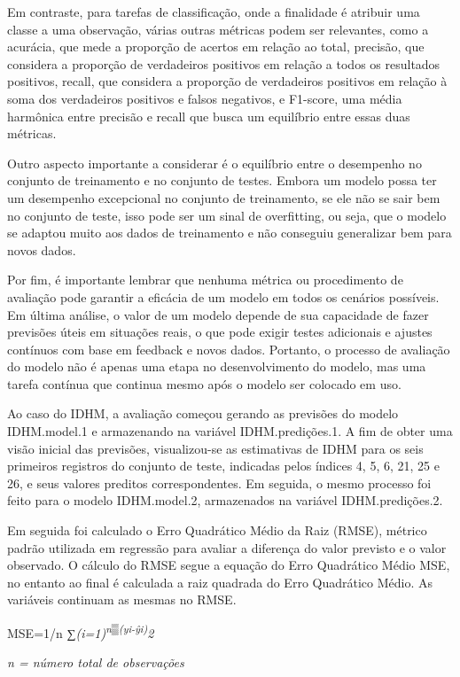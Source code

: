 \documentclass[
]{article}
\begin{document}
Em contraste, para tarefas de classificação, onde a finalidade é
atribuir uma classe a uma observação, várias outras métricas podem ser
relevantes, como a acurácia, que mede a proporção de acertos em relação
ao total, precisão, que considera a proporção de verdadeiros positivos
em relação a todos os resultados positivos, recall, que considera a
proporção de verdadeiros positivos em relação à soma dos verdadeiros
positivos e falsos negativos, e F1-score, uma média harmônica entre
precisão e recall que busca um equilíbrio entre essas duas métricas.

Outro aspecto importante a considerar é o equilíbrio entre o desempenho
no conjunto de treinamento e no conjunto de testes. Embora um modelo
possa ter um desempenho excepcional no conjunto de treinamento, se ele
não se sair bem no conjunto de teste, isso pode ser um sinal de
overfitting, ou seja, que o modelo se adaptou muito aos dados de
treinamento e não conseguiu generalizar bem para novos dados.

Por fim, é importante lembrar que nenhuma métrica ou procedimento de
avaliação pode garantir a eficácia de um modelo em todos os cenários
possíveis. Em última análise, o valor de um modelo depende de sua
capacidade de fazer previsões úteis em situações reais, o que pode
exigir testes adicionais e ajustes contínuos com base em feedback e
novos dados. Portanto, o processo de avaliação do modelo não é apenas
uma etapa no desenvolvimento do modelo, mas uma tarefa contínua que
continua mesmo após o modelo ser colocado em uso.

Ao caso do IDHM, a avaliação começou gerando as previsões do modelo
IDHM.model.1 e armazenando na variável IDHM.predições.1. A fim de obter
uma visão inicial das previsões, visualizou-se as estimativas de IDHM
para os seis primeiros registros do conjunto de teste, indicadas pelos
índices 4, 5, 6, 21, 25 e 26, e seus valores preditos correspondentes.
Em seguida, o mesmo processo foi feito para o modelo IDHM.model.2,
armazenados na variável IDHM.predições.2.

Em seguida foi calculado o Erro Quadrático Médio da Raiz (RMSE), métrico
padrão utilizada em regressão para avaliar a diferença do valor previsto
e o valor observado. O cálculo do RMSE segue a equação do Erro
Quadrático Médio MSE, no entanto ao final é calculada a raiz quadrada do
Erro Quadrático Médio. As variáveis continuam as mesmas no RMSE.

MSE=1/n ∑\emph{(i=1)\textsuperscript{n▒(yi-ŷi)}2}

\emph{n = número total de observações}
\end{document}
